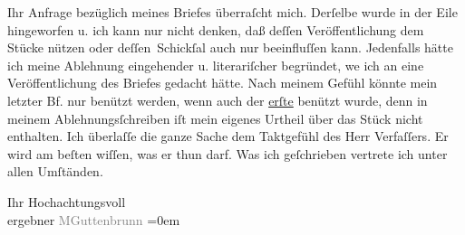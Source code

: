 \pstart
           Ihr Anfrage bezüglich meines Briefes überraſcht mich. Derſelbe wurde in der Eile
               hingeworfen u. ich kann nur nicht denken, {\pb}daß deſſen
               Veröffentlichung dem Stücke
               nützen oder deſſen Schickſal auch nur beeinfluſſen kann. Jedenfalls hätte ich meine
               Ablehnung eingehender u. literariſcher begründet, we{\geminationn} ich an eine Veröffentlichung
               des Briefes gedacht hätte. Nach meinem Gefühl könnte mein letzter Bf. nur benützt
               werden, wenn auch der \uline{erſte} benützt wurde, denn in
               meinem  Ablehnungsſchreiben iſt mein eigenes
               Urtheil über das Stück nicht
               enthalten. Ich überlaſſe die ganze Sache dem Taktgefühl des Herr Verfaſſers. Er wird
               am beſten wiſſen, was er thun darf. Was ich geſchrieben vertrete ich unter allen
               Umſtänden.\pend
           
\pstart
           Ihr Hochachtungsvoll{\\[\baselineskip]}ergebner \spacefill\mbox{\textcolor{gray}{MGuttenbrunn}}\pend
           \leftskip=0em{}\endnumbering{}
\begin{anhang}
\end{anhang}\newcommand{\dateiname}{L03929}\newcommand{\titel}{Arthur Schnitzler an Theodor Herzl, 1. 5. 1895}\newcommand{\editorInnen}{Herausgegeben von Jahnke, SelmaMüller, Martin Anton}
